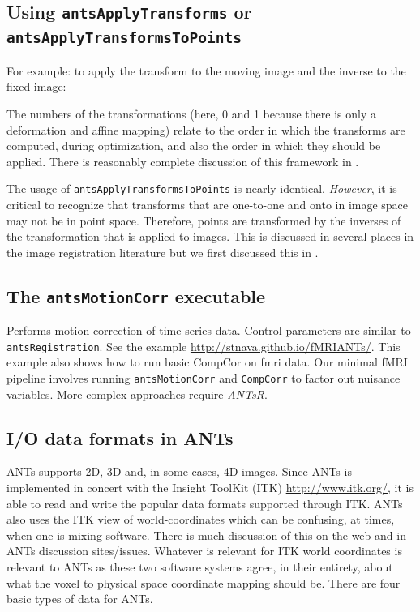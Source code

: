 \documentclass{InsightArticle}
\begin{document}
\subsection{Using \texttt{antsApplyTransforms} or \texttt{antsApplyTransformsToPoints}}
For example: to apply the transform to the moving image and the
inverse to the fixed image:

The numbers of the transformations (here, 0 and 1 because there is
only a deformation and affine mapping) relate to the order in which
the transforms are computed, during optimization, and also the order
in which they should be applied.  There is reasonably complete
discussion of this framework in \cite{AvantsITK}.

The usage of \texttt{antsApplyTransformsToPoints} is nearly identical.
\textit{However}, it is critical to recognize that transforms that are
one-to-one and onto in image space may not be in point space.
Therefore, points are transformed by the inverses of the
transformation that is applied to images.   This is discussed in
several places in the image registration literature but we first
discussed this in \cite{Avants2006d}.

\subsection{The \texttt{antsMotionCorr} executable }
Performs motion correction of time-series data.  Control parameters
are similar to \texttt{antsRegistration}.  See the example
\href{http://stnava.github.io/fMRIANTs/}{http://stnava.github.io/fMRIANTs/}.
This example also shows how to run basic CompCor on fmri data.  Our
minimal fMRI pipeline involves running \texttt{antsMotionCorr} and
\texttt{CompCorr} to factor out nuisance variables.  More complex
approaches require \textit{ANTsR}.

\subsection{I/O data formats in ANTs}
ANTs supports 2D, 3D and, in some cases, 4D images. 
Since ANTs is implemented in concert with the Insight ToolKit (ITK) \href{http://www.itk.org/}{http://www.itk.org/}, 
it is able to read and write the popular data formats supported
through ITK.  ANTs also uses the ITK view of world-coordinates which
can be confusing, at times, when one is mixing software.  There is
much discussion of this on the web and in ANTs discussion
sites/issues.  Whatever is relevant for ITK
world coordinates is relevant to ANTs as these two software systems
agree, in their entirety, about what the voxel to physical space
coordinate mapping should be. 
There are four basic types of data for ANTs.
\end{document}
